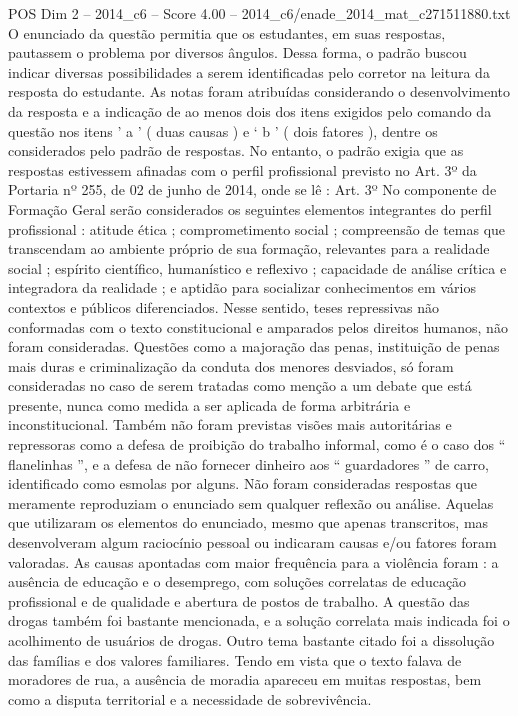 \begin{textsample}{POS Dim 2 – 2014\_c6 – Score 4.00 – 2014\_c6/enade\_2014\_mat\_c271511880.txt}
O enunciado da questão permitia que os estudantes, em suas respostas, pautassem o problema por diversos ângulos.
Dessa forma, o padrão buscou indicar diversas possibilidades a serem identificadas pelo corretor na leitura da resposta do estudante.
As notas foram atribuídas considerando o desenvolvimento da resposta e a indicação de ao menos dois dos itens exigidos pelo comando da questão nos itens ’ a ’ ( duas causas ) e ‘ b ’ ( dois fatores ), dentre os considerados pelo padrão de respostas.
No entanto, o padrão exigia que as respostas estivessem afinadas com o perfil profissional previsto no Art. 3º da Portaria nº 255, de 02 de junho de 2014, onde se lê : Art. 3º No componente de Formação Geral serão considerados os seguintes elementos integrantes do perfil profissional : atitude ética ; comprometimento social ; compreensão de temas que transcendam ao ambiente próprio de sua formação, relevantes para a realidade social ; espírito científico, humanístico e reflexivo ; capacidade de análise crítica e integradora da realidade ; e aptidão para socializar conhecimentos em vários contextos e públicos diferenciados.
Nesse sentido, teses repressivas não conformadas com o texto constitucional e amparados pelos direitos humanos, não foram consideradas.
Questões como a majoração das penas, instituição de penas mais duras e criminalização da conduta dos menores desviados, só foram consideradas no caso de serem tratadas como menção a um debate que está presente, nunca como medida a ser aplicada de forma arbitrária e inconstitucional.
Também não foram previstas visões mais autoritárias e repressoras como a defesa de proibição do trabalho informal, como é o caso dos “ flanelinhas ”, e a defesa de não fornecer dinheiro aos “ guardadores ” de carro, identificado como esmolas por alguns.
Não foram consideradas respostas que meramente reproduziam o enunciado sem qualquer reflexão ou análise.
Aquelas que utilizaram os elementos do enunciado, mesmo que apenas transcritos, mas desenvolveram algum raciocínio pessoal ou indicaram causas e/ou fatores foram valoradas.
As causas apontadas com maior frequência para a violência foram : a ausência de educação e o desemprego, com soluções correlatas de educação profissional e de qualidade e abertura de postos de trabalho.
A questão das drogas também foi bastante mencionada, e a solução correlata mais indicada foi o acolhimento de usuários de drogas.
Outro tema bastante citado foi a dissolução das famílias e dos valores familiares.
Tendo em vista que o texto falava de moradores de rua, a ausência de moradia apareceu em muitas respostas, bem como a disputa territorial e a necessidade de sobrevivência.

\end{textsample}
